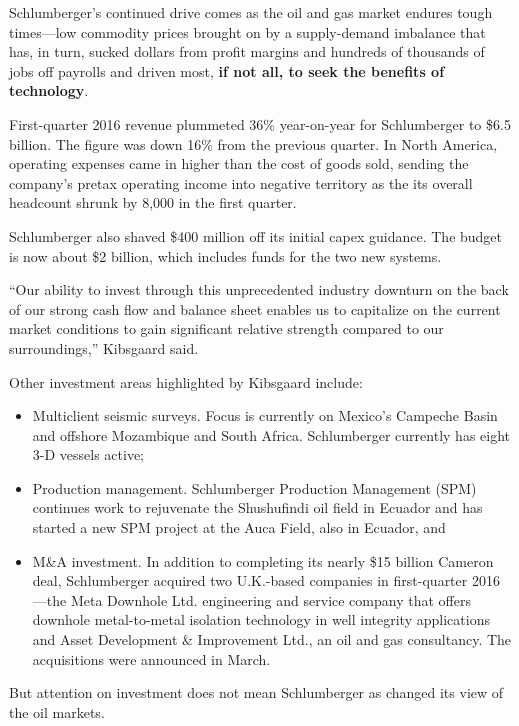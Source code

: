 \documentclass[12pt,a4paper]{article}
\begin{document}
Schlumberger's continued drive comes as the oil and gas market endures tough
times---low commodity prices brought on by a supply-demand imbalance that
has, in turn, sucked dollars from profit margins and hundreds of thousands
of jobs off payrolls and driven most, \textbf{if not all, to seek the
  benefits of technology}.

First-quarter 2016 revenue plummeted 36\% year-on-year for Schlumberger to
\$6.5 billion. The figure was down 16\% from the previous quarter. In North
America, operating expenses came in higher than the cost of goods sold,
sending the company's pretax operating income into negative territory as the
its overall headcount shrunk by 8,000{} in the first quarter.

Schlumberger also shaved \$400 million off its initial capex guidance. The 
budget is now about \$2 billion, which includes funds for the two new 
systems.

``Our ability to invest through this unprecedented industry downturn on the 
back of our strong cash flow and balance sheet enables us to capitalize on 
the current market conditions to gain significant relative strength compared 
to our surroundings,'' Kibsgaard said.

Other investment areas highlighted by Kibsgaard include:

\begin{itemize}%
\item Multiclient seismic surveys. Focus is currently on Mexico's Campeche
  Basin and offshore Mozambique and South Africa. Schlumberger currently has
  eight 3-D vessels active;
\item Production management. Schlumberger Production Management (SPM)
  continues work to rejuvenate the Shushufindi oil field in Ecuador and has
  started a new SPM project at the Auca Field, also in Ecuador, and
\item M\&A investment. In addition to completing its nearly \$15 billion
  Cameron deal, Schlumberger acquired two U.K.-based companies in
  first-quarter 2016---the Meta Downhole Ltd. engineering and service
  company that offers downhole metal-to-metal isolation technology in well
  integrity applications and Asset Development \& Improvement Ltd., an oil
  and gas consultancy. The acquisitions were announced in March.
\end{itemize}

But attention on investment does not mean Schlumberger as changed its view
of the oil markets.
\end{document}
